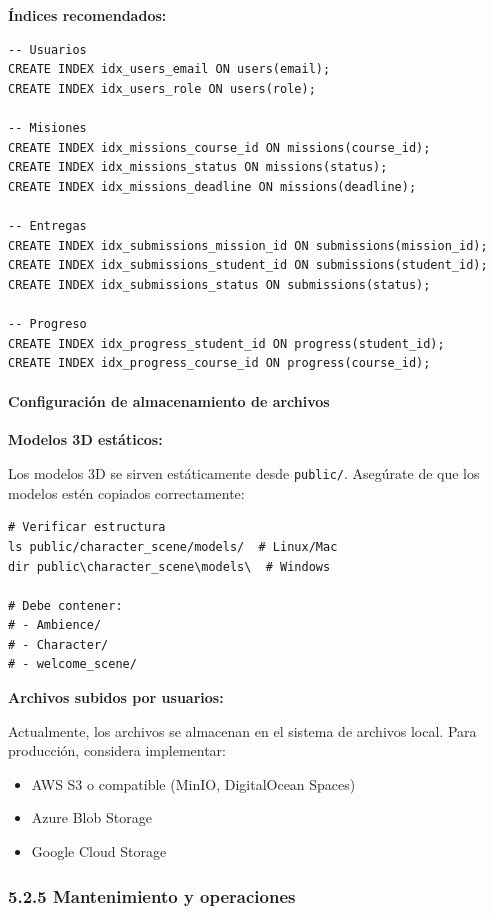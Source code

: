 \textbf{Índices recomendados:}

\begin{verbatim}
-- Usuarios
CREATE INDEX idx_users_email ON users(email);
CREATE INDEX idx_users_role ON users(role);

-- Misiones
CREATE INDEX idx_missions_course_id ON missions(course_id);
CREATE INDEX idx_missions_status ON missions(status);
CREATE INDEX idx_missions_deadline ON missions(deadline);

-- Entregas
CREATE INDEX idx_submissions_mission_id ON submissions(mission_id);
CREATE INDEX idx_submissions_student_id ON submissions(student_id);
CREATE INDEX idx_submissions_status ON submissions(status);

-- Progreso
CREATE INDEX idx_progress_student_id ON progress(student_id);
CREATE INDEX idx_progress_course_id ON progress(course_id);
\end{verbatim}

\paragraph{Configuración de almacenamiento de archivos}

\textbf{Modelos 3D estáticos:}

Los modelos 3D se sirven estáticamente desde \texttt{public/}. Asegúrate de que los modelos estén copiados correctamente:

\begin{verbatim}
# Verificar estructura
ls public/character_scene/models/  # Linux/Mac
dir public\character_scene\models\  # Windows

# Debe contener:
# - Ambience/
# - Character/
# - welcome_scene/
\end{verbatim}

\textbf{Archivos subidos por usuarios:}

Actualmente, los archivos se almacenan en el sistema de archivos local. Para producción, considera implementar:

\begin{itemize}
	\item AWS S3 o compatible (MinIO, DigitalOcean Spaces)
	\item Azure Blob Storage
	\item Google Cloud Storage
\end{itemize}

\subsubsection{5.2.5 Mantenimiento y operaciones}

